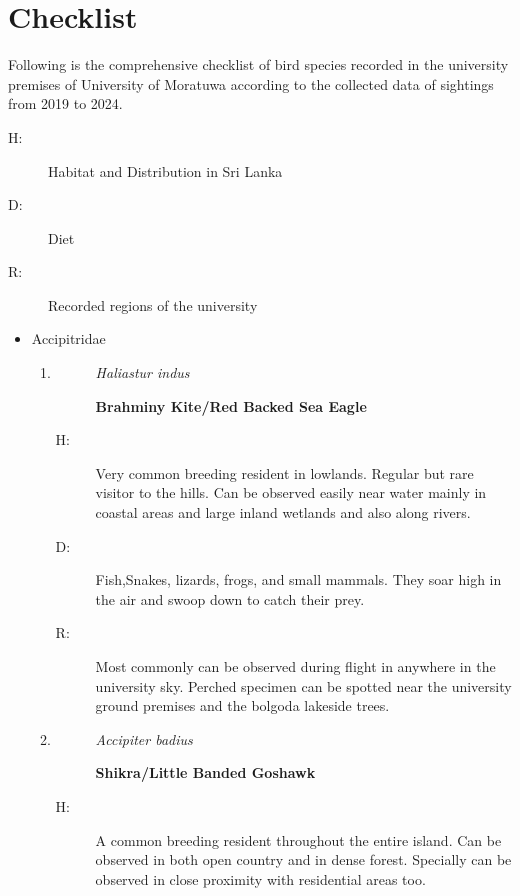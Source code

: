\chapter{Checklist}
\label{cp:checklist}
Following is the comprehensive checklist of bird species recorded in the university premises of University of Moratuwa according to the collected data of sightings from 2019 to 2024.

\begin{description}
    \item[H:] Habitat and Distribution in Sri Lanka
    \item[D:] Diet
    \item[R:] Recorded regions of the university 
\end{description}
\begin{itemize}%
\item%
 Accipitridae%
\begin{enumerate}%
\item%
\begin{description}%
\item[]%
\textit{Haliastur indus}%
\item[]%
\textbf{Brahminy Kite/Red Backed Sea Eagle}%
\end{description}%
\begin{description}%
\item[H: ]%
Very common breeding resident in lowlands. Regular but rare visitor to the hills. Can be observed easily near water mainly in coastal areas and large inland wetlands and also along rivers.%
\item[D: ]%
Fish,Snakes, lizards, frogs, and small mammals. They soar high in the air and swoop down to catch their prey.%
\item[R: ]%
Most commonly can  be observed during flight in anywhere in the university sky. Perched specimen can be spotted near the university ground premises and the bolgoda lakeside trees.%
\end{description}%
\item%
\begin{description}%
\item[]%
\textit{Accipiter badius}%
\item[]%
\textbf{Shikra/Little Banded Goshawk}%
\end{description}%
\begin{description}%
\item[H: ]%
A common breeding resident throughout the entire island. Can be observed in both open country and in dense forest. Specially can be observed in close proximity with residential areas too.%

\end{description}
\end{enumerate}
\end{itemize}

